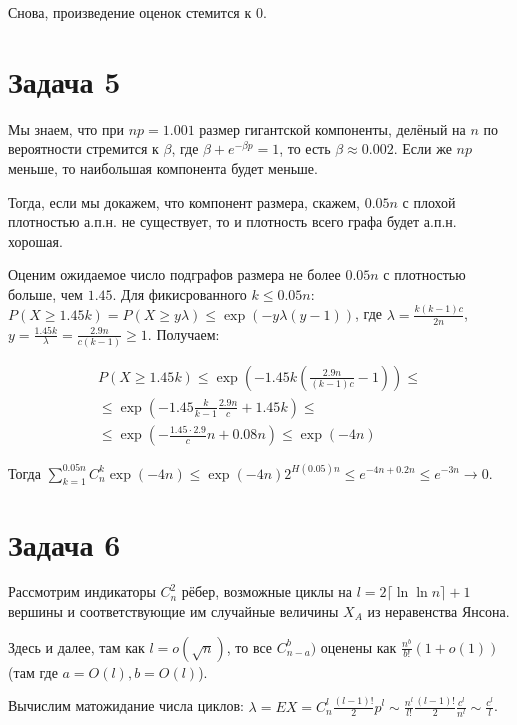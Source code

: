 \documentclass{article}
\theoremstyle{definition}
\theoremstyle{remark}
\renewcommand{\le}{\leqslant}
\renewcommand{\ge}{\geqslant}
\begin{document}
Снова, произведение оценок стемится к 0.

\section*{Задача 5}

Мы знаем, что при $np = 1.001$ размер гигантской компоненты, делёный на $n$ по вероятности стремится
к $\beta$, где $\beta + e^{-\beta p} = 1$, то есть $\beta \approx 0.002$. Если же $np$ меньше, то
наибольшая компонента будет меньше.

Тогда, если мы докажем, что компонент размера, скажем, $0.05n$ с плохой плотностью а.п.н. не
существует, то и плотность всего графа будет а.п.н. хорошая.

Оценим ожидаемое число подграфов размера не более $0.05n$ с плотностью больше, чем $1.45$. Для
фикисрованного $k \le 0.05n$:
$P(X \ge 1.45k) = P(X \ge y\lambda) \le \exp(-y\lambda (y - 1))$, где
$\lambda = \frac{k(k-1)c}{2n}$, $y = \frac{1.45k}{\lambda} = \frac{2.9n}{c(k-1)} \ge 1$. Получаем:

\begin{multline*}
	P(X \ge 1.45k) \le \exp\left(-1.45k \left(\frac{2.9n}{(k-1)c} - 1 \right)\right) \le\\\le
	\exp\left( -1.45 \frac{k}{k-1}\frac{2.9n}{c} + 1.45k\right) \le\\\le
	\exp\left(-\frac{1.45 \cdot 2.9}{c} n + 0.08n\right) \le \exp(-4n)
\end{multline*}

Тогда $\sum\limits_{k=1}^{0.05n} C_n^k \exp(-4n) \le \exp(-4n) 2^{H(0.05)n} \le e^{-4n + 0.2n} \le
e^{-3n} \rightarrow 0$.

\section*{Задача 6}

Рассмотрим индикаторы $C_n^2$ рёбер, возможные циклы на $l = 2\lceil \ln \ln n \rceil + 1$
вершины и соответствующие им случайные величины $X_A$ из неравенства Янсона.

Здесь и далее, там как $l = o(\sqrt{n})$, то все $C_{n - a}^{b})$ оценены как $\frac{n^b}{b!} (1 +
o(1))$ (там где $a = O(l), b = O(l)$).

Вычислим матожидание числа циклов: $\lambda = EX = C_n^l \frac{(l-1)!}{2} p^l \sim \frac{n^l}{l!}
\frac{(l-1)!}{2} \frac{c^l}{n^l} \sim \frac{c^l}{l}$.
\end{document}
